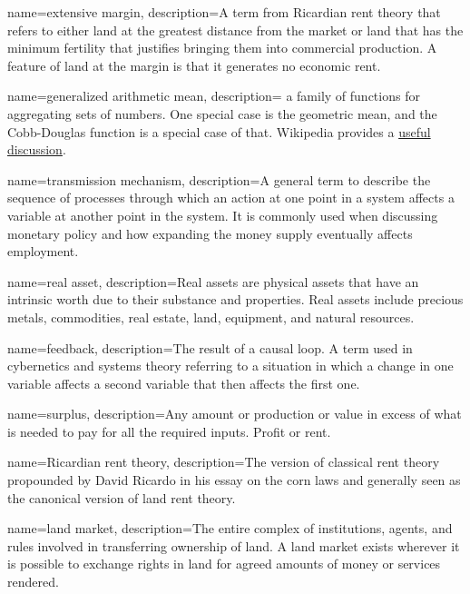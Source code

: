{
name=extensive margin,
description={A term from Ricardian rent theory that refers to either land at the greatest distance from the market or land that has the minimum fertility that justifies bringing them into commercial production. A feature of land at the margin is that it generates no \gls{economic rent}. }
}

{
name=generalized arithmetic mean,
description={ a family of functions for aggregating sets of numbers. One special case is the geometric mean,  and the Cobb-Douglas function is a special case of that. Wikipedia provides a \href{https://en.wikipedia.org/wiki/Generalized_mean}{useful discussion}. }
}

{
name=transmission mechanism,
description={A general term to describe the sequence of processes through which an action at one point in a system  affects a variable at another point in the system. It is commonly used when discussing  monetary policy and how  expanding the money supply eventually affects employment.}
}

{
name=real asset,
description={Real assets are physical assets that have an intrinsic worth due to their substance and properties. Real assets include precious metals, commodities, real estate, land, equipment, and natural resources. }
}


{
name=feedback,
description={The result of a causal loop. A term used in cybernetics and systems theory referring to a situation in which a change in one variable affects a second variable that then affects the first one.}
}

{
name=surplus,
description={Any amount or production or value in excess of what  is needed to pay for all the required inputs. Profit or rent. }
}

{
name=Ricardian rent theory,
description={The version of classical rent theory propounded by David Ricardo in his essay on the corn laws and generally seen as the  canonical version of land rent theory.}
}

{
name=land market,
description={The entire complex of institutions, agents, and rules involved in transferring ownership of land. A land market exists wherever it is possible to exchange rights in land for agreed amounts of money or services rendered.}
}

